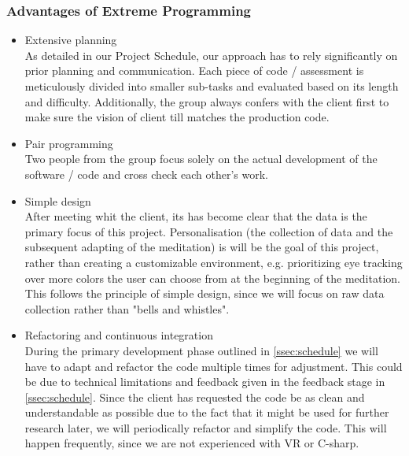 \documentclass[coverpage,lineno]{../custom}
\begin{document}
\subsubsection{Advantages of Extreme Programming}
\begin{itemize}
    \item Extensive planning \\
    As detailed in our Project Schedule, our approach has to rely significantly on prior planning and communication. Each piece of code / assessment is meticulously divided into smaller sub-tasks and evaluated based on its length and difficulty. Additionally, the group always confers with the client first to make sure the vision of client till matches the production code.
    \item Pair programming \\
    Two people from the group focus solely on the actual development of the software / code and cross check each other's work. 
    \item Simple design \\
    After meeting whit the client, its has become clear that the data is the primary focus of this project. Personalisation (the collection of data and the subsequent adapting of the meditation) is will be the goal of this project, rather than creating a customizable environment, e.g. prioritizing eye tracking over more colors the user can choose from at the beginning of the meditation. This follows the principle of simple design, since we will focus on raw data collection rather than "bells and whistles".
    \item Refactoring and continuous integration \\
     During the primary development phase outlined in \cref{ssec:schedule} we will have to adapt and refactor the code multiple times for adjustment. This could be due to technical limitations and feedback given in the feedback stage in \cref{ssec:schedule}. Since the client has requested the code be as clean and understandable as possible due to the fact that it might be used for further research later, we will periodically refactor and simplify the code. This will happen frequently, since we are not experienced with VR or C-sharp.
\end{itemize}
\end{document}

